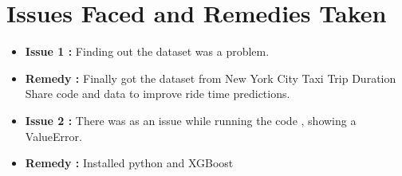 \documentclass[12pt,report]{ucdavisthesis}
\begin{document}
                
                
  
   \newpage \section{Issues Faced and Remedies Taken}
 \begin{itemize}
    \item \textbf{Issue 1 :} Finding out the dataset was a problem.
    \item \textbf{Remedy :} Finally got the  dataset from New York City Taxi Trip Duration
    Share code and data to improve ride time predictions.
    \item \textbf{Issue 2 :} There was as an issue while running the code , showing a ValueError.
    \item \textbf{Remedy :} Installed python and XGBoost
\end{itemize}
\end{document}
